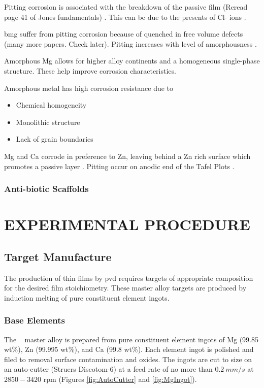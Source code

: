 \documentclass[a4paper,12pt,oneside]{report}%
\begin{document}
Pitting corrosion is associated with the breakdown of the passive film (Reread page 41 of Jones fundamentals) \cite{Zheng2014, Jones1992, Schweitzer2009}. This can be due to the presents of Cl- ions \cite{Zheng2014}. 

 \Gls{bmg} suffer from pitting corrosion because of quenched in free volume defects \cite{Wang2012} (many more papers. Check later). Pitting increases with level of amorphousness \cite{Schluter2012}. 

Amorphous Mg allows for higher alloy continents and a homogeneous single-phase structure. These help improve corrosion characteristics. 

Amorphous metal has high corrosion resistance due to

\begin{itemize}
	\item Chemical homogeneity 
	\item Monolithic structure
	\item Lack of grain boundaries 
\end{itemize}
 
Mg and Ca corrode in preference to Zn, leaving behind a Zn rich surface which promotes a passive layer \cite{Wang2012}.
Pitting occur on anodic end of the Tafel Plots \cite{Schluter2012}.

\subsection{Anti-biotic Scaffolds}



\chapter{EXPERIMENTAL PROCEDURE}
\glsresetall

\section{Target Manufacture} \label{sec:TargetManufacture}
The production of thin films by \gls{pvd} requires targets of appropriate composition for the desired film stoichiometry. These master alloy targets are produced by induction melting of pure constituent element ingots.

\subsection{Base Elements}
The \MgZnCa~ master alloy is prepared from pure constituent element ingots of Mg (99.85 wt\%), Zn (99.995 wt\%), and Ca (99.8 wt\%). Each element ingot is polished and filed to removal surface contamination and oxides. The ingots are cut to size on an auto-cutter (Struers Discotom-6) at a feed rate of no more than $0.2~ mm/s$ at $2850 - 3420$ \acrshort{rpm} (Figures \ref{fig:AutoCutter} and \ref{fig:MgIngot}).
\end{document}

